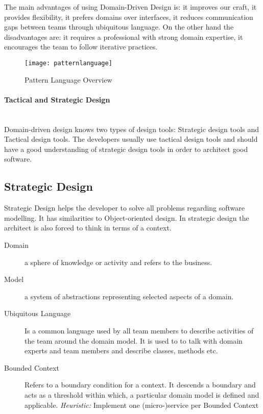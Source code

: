 The main advantages of using Domain-Driven Design is: it improves our craft, it provides flexibility, it prefers domains over interfaces, it reduces communication gaps between teams through ubiquitous language. On the other hand the disadvantages are: it requires a professional with strong domain expertise, it encourages the team to follow iterative practices.

\begin{figure}[H]
  \center
  \texttt{[image: patternlanguage]}
  \caption{Pattern Language Overview}
\end{figure}


\paragraph{Tactical and Strategic Design} \hfill \\
Domain-driven design knows two types of design tools: Strategic design tools and Tactical design tools. The developers usually use tactical design tools and should have a good understanding of strategic design tools in order to architect good software.

\pagebreak

\subsection{Strategic Design}
Strategic Design helps the developer to solve all problems regarding software modelling. It has similarities to Object-oriented design. In strategic design the architect is also forced to think in terms of a context.

\begin{description}
	\item [Domain] a sphere of knowledge or activity and refers to the business. 
	\item [Model] a system of abstractions representing selected aspects of a domain.
	\item [Ubiquitous Language] Is a common language used by all team members to describe activities of the team around the domain model. It is used to to talk with domain experts and team members and describe classes, methods etc.
	\item [Bounded Context] Refers to a boundary condition for a context. It descends a boundary and acts as a threshold within which, a particular domain model is defined and applicable. \textit{Heuristic:} Implement one (micro-)service per Bounded Context
\end{description}

